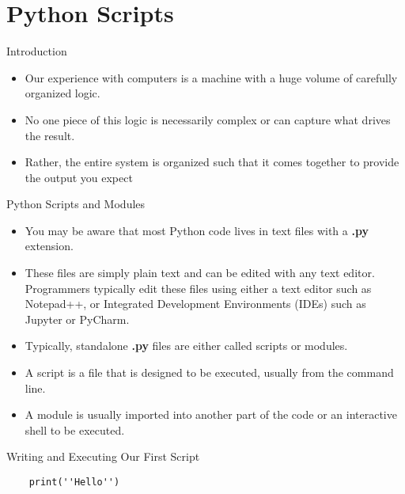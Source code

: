 \section{Python Scripts}
\label{sec:introduction}

\begin{frame}{Introduction}
  \begin{itemize} \parskip3mm \justifying
  \item   Our experience with computers is a machine with a huge volume of carefully organized
    logic.
\item No one piece of this logic is necessarily complex or can capture what drives the
result. 
\item Rather, the entire system is organized such that it comes together to provide the
output you expect
  \end{itemize}
\end{frame}

\begin{frame}{Python Scripts and Modules}
  \begin{itemize} \parskip3mm \justifying
  \item You may be aware that most Python code lives in text files with a \textbf{.py} extension. 
  \item These files are simply plain text and can be edited with any text editor. Programmers typically edit these files using either a text editor such
as Notepad++, or Integrated Development Environments (IDEs) such as Jupyter or PyCharm.
\item Typically, standalone \textbf{.py} files are either called \alert{scripts} or \alert{modules}. 
\item A script is a file that is designed to be executed, usually from the command line. 
\item A  module is usually imported into another part of the code or an interactive shell to be executed. 
\end{itemize}


\begin{exercise}{Writing and Executing Our First Script}
  \begin{lstlisting}
    print(''Hello'')
  \end{lstlisting}
\end{exercise}
\end{frame}




